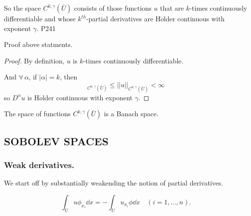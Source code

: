 \original
{
    So the space $C^{k,\gamma}(\bar{U})$ consists of those functions $u$ that are $k$-times continuously differentiable and whose $k^{th}$-partial derivatives are H$\ddot{o}$lder continuous with exponent $\gamma$.
}
{P241}
\begin{proposition}
    Proof above statments.
\end{proposition}

\begin{proof}
    By definition, $u$ is $k$-times continuously differentiable.
    \par
    And $\forall \, \alpha $, if $|\alpha|=k$, then
    \begin{equation*}
        [D^{\alpha}u]_{C^{0,\gamma}(\bar{U})}\leq ||u||_{C^{k,\gamma}(\bar{U})}<\infty
    \end{equation*}
    so $D^{\alpha}u$ is H$\ddot{o}$lder continuous with exponent $\gamma$.
\end{proof}

\begin{theorem}
    The space of functions $C^{k,\gamma}(\bar{U})$ is a Banach space.
\end{theorem}



\subsection{SOBOLEV SPACES}

\subsubsection{Weak derivatives.}

We start off by substantially weakending the notion of partial derivatives.

\begin{equation}
    \int_U u\phi_{x_i}\dd x=-\int_U u_{x_i}\phi \dd x\quad (i=1,...,n).
\end{equation}